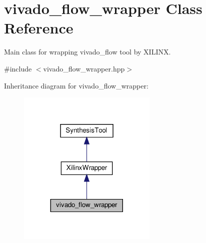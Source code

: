 \hypertarget{classvivado__flow__wrapper}{}\section{vivado\+\_\+flow\+\_\+wrapper Class Reference}
\label{classvivado__flow__wrapper}


Main class for wrapping vivado\+\_\+flow tool by X\+I\+L\+I\+NX.  




{\ttfamily \#include $<$vivado\+\_\+flow\+\_\+wrapper.\+hpp$>$}



Inheritance diagram for vivado\+\_\+flow\+\_\+wrapper\+:
\nopagebreak
\begin{figure}[H]
\begin{center}
\leavevmode
\includegraphics[width=188pt]{d3/d29/classvivado__flow__wrapper__inherit__graph}
\end{center}
\end{figure}


